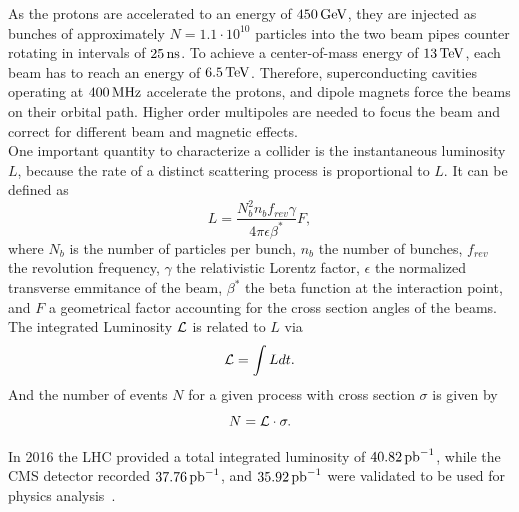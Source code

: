As the protons are accelerated to an energy of $450\,\text{Ge\hspace{-.08em}V}$, they are injected as bunches of approximately $N=1.1\cdot10^{10}$ particles into the two beam pipes counter rotating in intervals of $25\,\text{ns}$. To achieve a center-of-mass energy of $13\,\text{Te\hspace{-.08em}V}$, each beam has to reach an energy of $6.5\,\text{Te\hspace{-.08em}V}$. Therefore, superconducting cavities operating at $400\,\text{MHz}$ accelerate the protons, and dipole magnets force the beams on their orbital path. Higher order multipoles are needed to focus the beam and correct for different beam and magnetic effects.\\
One important quantity to characterize a collider is the instantaneous luminosity $L$, because the rate of a distinct scattering process is proportional to $L$. It can be defined as
\begin{equation}
 L = \frac{N_{b}^2 n_{b} f_{rev} \gamma} {4\pi \epsilon \beta^{*}}F,
\end{equation}
where $N_b$ is the number of particles per bunch, $n_b$ the number of bunches, $f_{rev}$ the revolution frequency, $\gamma$ the relativistic Lorentz factor, $\epsilon$ the normalized transverse emmitance of the beam, $\beta^{*}$ the beta function at the interaction point, and $F$ a geometrical factor accounting for the cross section angles of the beams. The integrated Luminosity $\mathcal{L}$ is related to $L$ via
\begin{equation}
 \mathcal{L}= \int L dt.
\end{equation}
And the number of events $N$ for a given process with cross section $\sigma$ is given by
\begin{equation}
 N= \mathcal{L} \cdot \sigma.
\end{equation}

In 2016 the LHC provided a total integrated luminosity of $40.82\mbox{\ensuremath{\,\text{pb}^\text{$-$1}}}$, while the CMS detector recorded $37.76\mbox{\ensuremath{\,\text{pb}^\text{$-$1}}}$, and $35.92\mbox{\ensuremath{\,\text{pb}^\text{$-$1}}}$ were validated to be used for physics analysis~\cite{DataQuality}.





